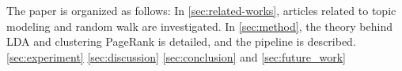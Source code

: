 The paper is organized as follows:
In \autoref{sec:related-works}, articles related to topic modeling and random walk are investigated.
In \autoref{sec:method}, the theory behind LDA and clustering PageRank is detailed, and the pipeline is described.
\autoref{sec:experiment}
\autoref{sec:discussion}
\autoref{sec:conclusion} and \autoref{sec:future_work}